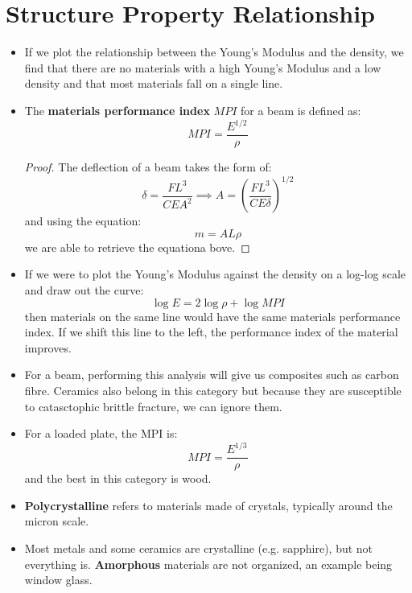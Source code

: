\section{Structure Property Relationship}
\begin{itemize}
    \item If we plot the relationship between the Young's Modulus and the density, we find that there are no materials with a high Young's Modulus and a low density and that most materials fall on a single line.
    \item The \textbf{materials performance index} $MPI$ for a beam is defined as:
    \begin{equation}
        MPI = \frac{E^{1/2}}{\rho}
    \end{equation}
    \begin{proof}
        The deflection of a beam takes the form of:
        \begin{equation}
            \delta = \frac{FL^3}{CEA^2} \implies A = \left(\frac{FL^3}{CE\delta}\right)^{1/2}
        \end{equation}
        and using the equation:
        \begin{equation}
            m=AL\rho
        \end{equation}
        we are able to retrieve the equationa bove.
    \end{proof}
    \item If we were to plot the Young's Modulus against the density on a log-log scale and draw out the curve:
    \begin{equation}
    \log E = 2\log \rho + \log MPI    
    \end{equation}
    then materials on the same line would have the same materials performance index. If we shift this line to the left, the performance index of the material improves.
    \item For a beam, performing this analysis will give us composites such as carbon fibre. Ceramics also belong in this category but because they are susceptible to catasctophic brittle fracture, we can ignore them.
    \item For a loaded plate, the MPI is:
    \begin{equation}
        MPI = \frac{E^{1/3}}{\rho}
    \end{equation}
    and the best in this category is wood.
    \item \textbf{Polycrystalline} refers to materials made of crystals, typically around the micron scale.
    \item Most metals and some ceramics are crystalline (e.g. sapphire), but not everything is. \textbf{Amorphous} materials are not organized, an example being window glass.

\end{itemize}

